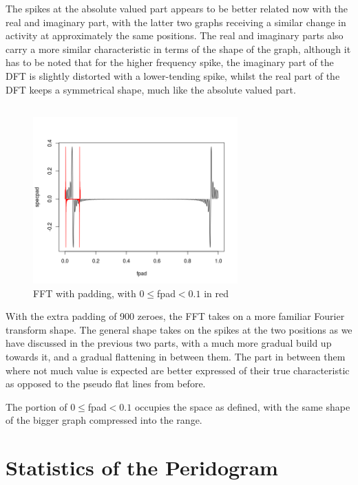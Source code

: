 \documentclass[paper=a4, fontsize=11pt]{scrartcl}
\numberwithin{equation}{section} %
\numberwithin{figure}{section} %
\numberwithin{table}{section} %
\begin{document}
The spikes at the absolute valued part appears to be better related now with the real and imaginary part, with the latter two graphs receiving a similar change in activity at approximately the same positions. The real and imaginary parts also carry a more similar characteristic in terms of the shape of the graph, although it has to be noted that for the higher frequency spike, the imaginary part of the DFT is slightly distorted with a lower-tending spike, whilst the real part of the DFT keeps a symmetrical shape, much like the absolute valued part.
\pagebreak
\subsection{}
\begin{figure}[htp]
	\centering
	\includegraphics[width=0.7\textwidth, clip]{q1c.png} 
	\caption{FFT with padding, with $0\leq$fpad$<0.1$ in red}
\end{figure}

With the extra padding of 900 zeroes, the FFT takes on a more familiar Fourier transform shape.
The general shape takes on the spikes at the two positions as we have discussed in the previous two parts, with a much more gradual build up towards it, and a gradual flattening in between them. The part in between them where not much value is expected are better expressed of their true characteristic as opposed to the pseudo flat lines from before.

The portion of $0\leq$fpad$<0.1$ occupies the space as defined, with the same shape of the bigger graph compressed into the range.
\pagebreak
\section{Statistics of the Peridogram}
\subsection{}
\end{document}
